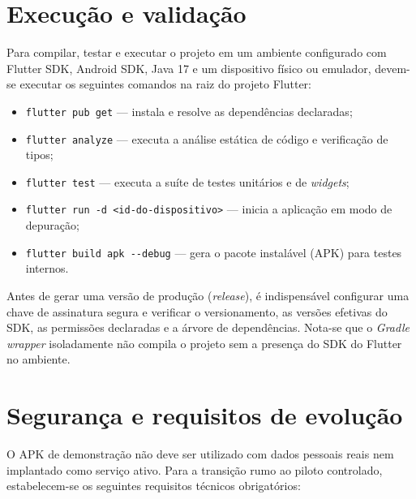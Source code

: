 \documentclass[12pt,a4paper]{article}
\begin{document}
\section{Execução e validação}
Para compilar, testar e executar o projeto em um ambiente configurado com Flutter SDK, Android SDK, Java 17 e um dispositivo físico ou emulador, devem-se executar os seguintes comandos na raiz do projeto Flutter:

\begin{itemize}[leftmargin=*]
  \item \texttt{flutter pub get} --- instala e resolve as dependências declaradas;
  \item \texttt{flutter analyze} --- executa a análise estática de código e verificação de tipos;
  \item \texttt{flutter test} --- executa a suíte de testes unitários e de \textit{widgets};
  \item \texttt{flutter run -d <id-do-dispositivo>} --- inicia a aplicação em modo de depuração;
  \item \texttt{flutter build apk -{}-debug} --- gera o pacote instalável (APK) para testes internos.
\end{itemize}

Antes de gerar uma versão de produção (\textit{release}), é indispensável configurar uma chave de assinatura segura e verificar o versionamento, as versões efetivas do SDK, as permissões declaradas e a árvore de dependências. Nota-se que o \textit{Gradle wrapper} isoladamente não compila o projeto sem a presença do SDK do Flutter no ambiente.

\section{Segurança e requisitos de evolução}
O APK de demonstração não deve ser utilizado com dados pessoais reais nem implantado como serviço ativo. Para a transição rumo ao piloto controlado, estabelecem-se os seguintes requisitos técnicos obrigatórios:
\end{document}
